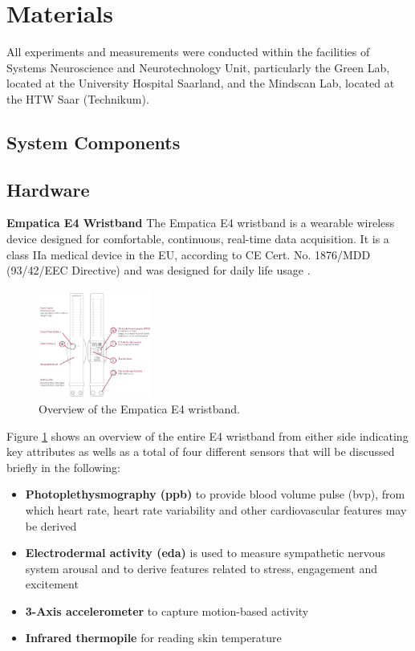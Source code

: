 \section{Materials}
All experiments and measurements were conducted within the facilities of Systems Neuroscience and Neurotechnology Unit, particularly the Green Lab, located at the University Hospital Saarland, and the Mindscan Lab, located at the HTW Saar (Technikum).

\subsection{System Components}
\subsection{Hardware}
\textbf{Empatica E4 Wristband}
The Empatica E4 wristband is a wearable wireless device designed for comfortable, continuous, real-time data acquisition. It is a class IIa medical device in the EU, according to CE Cert. No. 1876/MDD (93/42/EEC Directive) and was designed for daily life usage \cite{e4}.

\begin{figure}[ht]
	\centering
  \includegraphics[width=0.33\textwidth]{../images/E4overview.JPG}
	\caption{Overview of the Empatica E4 wristband.}
	\label{e4overview}
\end{figure}

Figure \ref{e4overview} shows an overview of the entire E4 wristband from either side indicating key attributes as wells as a total of four different sensors that will be discussed briefly in the following:

\begin{itemize}
\item \textbf{Photoplethysmography (\gls{ppb})} to provide blood volume pulse (\gls{bvp}), from which heart rate, heart rate variability and other cardiovascular features may be derived
\item \textbf{Electrodermal activity (\gls{eda})} is used to measure sympathetic nervous system arousal and to derive features related to stress, engagement and excitement
\item \textbf{3-Axis accelerometer} to capture motion-based activity
\item \textbf{Infrared thermopile} for reading skin temperature
\end{itemize}

